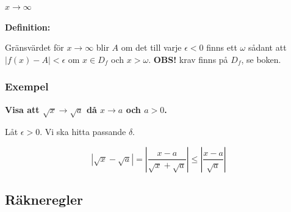 \documentclass[swedish]{article}
\begin{document}
{\Large\underline{$x \to \infty$}}

\smallbreak

\textbf{Definition:}

Gränsvärdet för $x \to \infty$ blir $A$ om det till varje $\epsilon < 0$ finns ett $\omega$ sådant att $|f(x) - A| < \epsilon$ om $x \in D_f$ och $x > \omega$. \textbf{OBS!} krav finns på $D_f$, se boken. 

\subsubsection{Exempel}

\textbf{Visa att $\sqrt{x} \to \sqrt{a}$ då $x \to a$ och $a > 0$.}

Låt $\epsilon > 0$. Vi ska hitta passande $\delta$.

\[|\sqrt{x} - \sqrt{a}| = \left|\frac{x-a}{\sqrt{x}+\sqrt{a}}\right| \leq \left|\frac{x-a}{\sqrt{a}}\right|\]

\subsection{Räkneregler}
\end{document}
